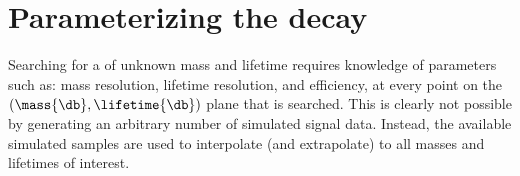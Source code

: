 \section{Parameterizing the decay}
\label{sec:param}

Searching for a \db of unknown mass and lifetime requires knowledge of parameters such as: mass
resolution, lifetime resolution, and efficiency, at every point on the
$(\mass{\db}, \lifetime{\db})$ plane that is searched.
This is clearly not possible by generating an arbitrary number of simulated signal data.
Instead, the available simulated samples are used to interpolate (and extrapolate) to all masses
and lifetimes of interest.





